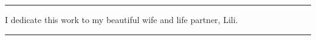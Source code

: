 \null
\vfill


\begin{center}
\noindent\rule[2pt]{0.1\textwidth}{0.5pt}
I dedicate this work to my beautiful wife and life partner, Lili.
\noindent\rule[2pt]{0.1\textwidth}{0.5pt}
\end{center}


\vfill

\clearpage
